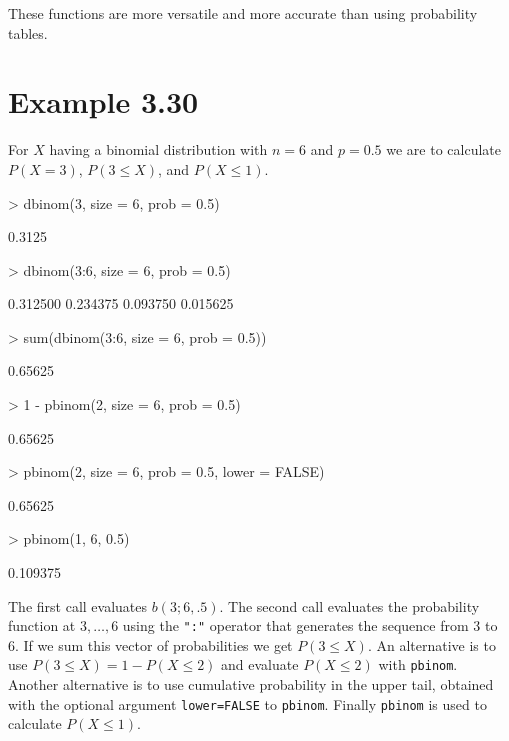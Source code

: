 \documentclass{book}
\begin{document}
These functions are more versatile and more accurate than using
probability tables.

\section{Example 3.30}
\label{sec:xmp0330}
For $X$ having a binomial distribution with $n=6$ and $p=0.5$ we are
to calculate $P(X=3)$, $P(3\le X)$, and $P(X\le 1)$.
\begin{Schunk}
\begin{Sinput}
> dbinom(3, size = 6, prob = 0.5)
\end{Sinput}
\begin{Soutput}
[1] 0.3125
\end{Soutput}
\begin{Sinput}
> dbinom(3:6, size = 6, prob = 0.5)
\end{Sinput}
\begin{Soutput}
[1] 0.312500 0.234375 0.093750 0.015625
\end{Soutput}
\begin{Sinput}
> sum(dbinom(3:6, size = 6, prob = 0.5))
\end{Sinput}
\begin{Soutput}
[1] 0.65625
\end{Soutput}
\begin{Sinput}
> 1 - pbinom(2, size = 6, prob = 0.5)
\end{Sinput}
\begin{Soutput}
[1] 0.65625
\end{Soutput}
\begin{Sinput}
> pbinom(2, size = 6, prob = 0.5, lower = FALSE)
\end{Sinput}
\begin{Soutput}
[1] 0.65625
\end{Soutput}
\begin{Sinput}
> pbinom(1, 6, 0.5)
\end{Sinput}
\begin{Soutput}
[1] 0.109375
\end{Soutput}
\end{Schunk}
The first call evaluates $b(3; 6, .5)$. The second call evaluates the
probability function at $3,\dots,6$ using the \texttt{":"} operator
that generates the sequence from 3 to 6.  If we sum this vector of
probabilities we get $P(3\le X)$.  An alternative is to use $P(3\le
X)=1-P(X\le2)$ and evaluate $P(X\le 2)$ with \texttt{pbinom}.  Another
alternative is to use cumulative probability in the upper tail,
obtained with the optional argument \texttt{lower=FALSE} to
\texttt{pbinom}.  Finally \texttt{pbinom} is used to calculate $P(X\le
1)$.
\end{document}
